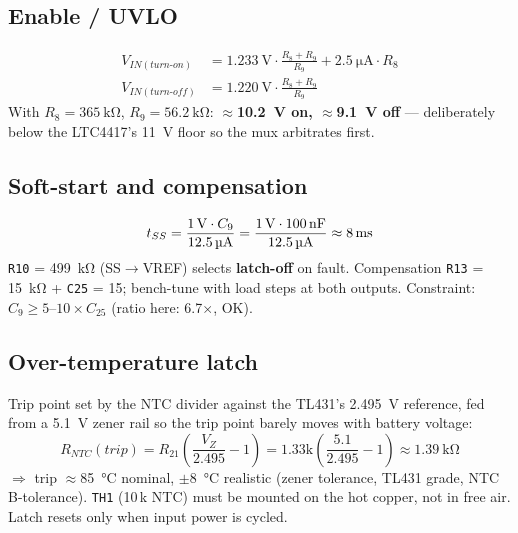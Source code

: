 \documentclass[11pt,a4paper]{article}
\newcommand{\comp}[1]{\texttt{#1}}                 %
\begin{document}
\subsection{Enable / UVLO}
\begin{align}
  V_{IN(turn\text{-}on)}  &= \SI{1.233}{\V}\cdot\frac{R_8+R_9}{R_9} + \SI{2.5}{\uA}\cdot R_8 \nonumber \\
  V_{IN(turn\text{-}off)} &= \SI{1.220}{\V}\cdot\frac{R_8+R_9}{R_9}
\end{align}
With $R_8 = \SI{365}{\kilo\ohm}$, $R_9 = \SI{56.2}{\kilo\ohm}$:
\textbf{$\approx$\SI{10.2}{\V} on, $\approx$\SI{9.1}{\V} off} --- deliberately
below the LTC4417's \SI{11}{\V} floor so the mux arbitrates first.

\subsection{Soft-start and compensation}
\begin{equation}
  t_{SS} = \frac{\SI{1}{\V} \cdot C_9}{\SI{12.5}{\uA}}
         = \frac{\SI{1}{\V} \cdot \SI{100}{\nF}}{\SI{12.5}{\uA}}
         \approx \SI{8}{\ms}
\end{equation}
\comp{R10} = \SI{499}{\kilo\ohm} (SS$\rightarrow$VREF) selects \textbf{latch-off}
on fault. Compensation \comp{R13} = \SI{15}{\kilo\ohm} + \comp{C25} =
\SI{15}{\nF}; bench-tune with load steps at both outputs. Constraint:
$C_9 \ge 5$--$10 \times C_{25}$ (ratio here: 6.7$\times$, OK).

\subsection{Over-temperature latch}
Trip point set by the NTC divider against the TL431's \SI{2.495}{\V} reference,
fed from a \SI{5.1}{\V} zener rail so the trip point barely moves with battery
voltage:
\begin{equation}
  R_{NTC}(trip) = R_{21}\left(\frac{V_Z}{2.495} - 1\right)
                = 1.33\text{k}\left(\frac{5.1}{2.495}-1\right)
                \approx \SI{1.39}{\kilo\ohm}
\end{equation}
$\Rightarrow$ trip $\approx$\SI{85}{\celsius} nominal, $\pm$\SI{8}{\celsius}
realistic (zener tolerance, TL431 grade, NTC B-tolerance).
\comp{TH1} (10\,k NTC) must be mounted on the hot copper, not in free air.
Latch resets only when input power is cycled.
\end{document}
